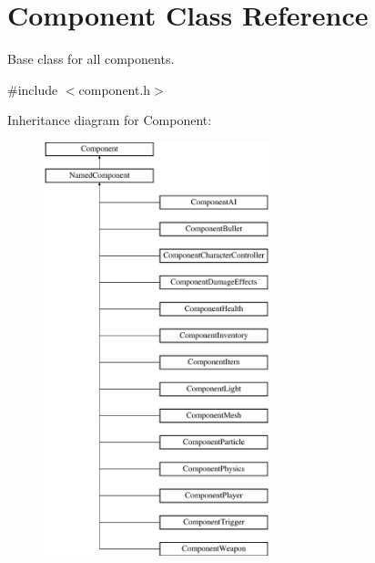 \hypertarget{classComponent}{
\section{\-Component \-Class \-Reference}
\label{d8/d6b/classComponent}
}


\-Base class for all components.  




{\ttfamily \#include $<$component.\-h$>$}

\-Inheritance diagram for \-Component\-:\begin{figure}[H]
\begin{center}
\leavevmode
\includegraphics[height=12.000000cm]{d8/d6b/classComponent}
\end{center}
\end{figure}
